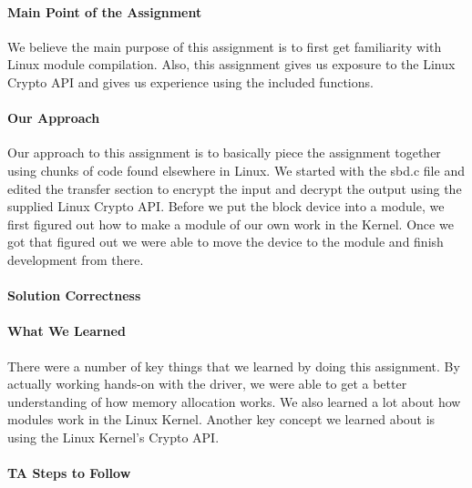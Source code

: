\documentclass[titlepage,draftclsnofoot,onecolumn]{article}
\begin{document}
\paragraph{Main Point of the Assignment}
We believe the main purpose of this assignment is to first get familiarity with Linux module compilation. Also, this assignment gives us exposure to the Linux Crypto API and gives us experience using the included functions.

\paragraph{Our Approach}
Our approach to this assignment is to basically piece the assignment together using chunks of code found elsewhere in Linux. We started with the sbd.c file and edited the transfer section to encrypt the input and decrypt the output using the supplied Linux Crypto API. Before we put the block device into a module, we first figured out how to make a module of our own work in the Kernel. Once we got that figured out we were able to move the device to the module and finish development from there.

\paragraph{Solution Correctness}


\paragraph{What We Learned}
There were a number of key things that we learned by doing this assignment. By actually working hands-on with the driver, we were able to get a better understanding of how memory allocation works. We also learned a lot about how modules work in the Linux Kernel. Another key concept we learned about is using the Linux Kernel's Crypto API.

\paragraph{TA Steps to Follow}
\end{document}
